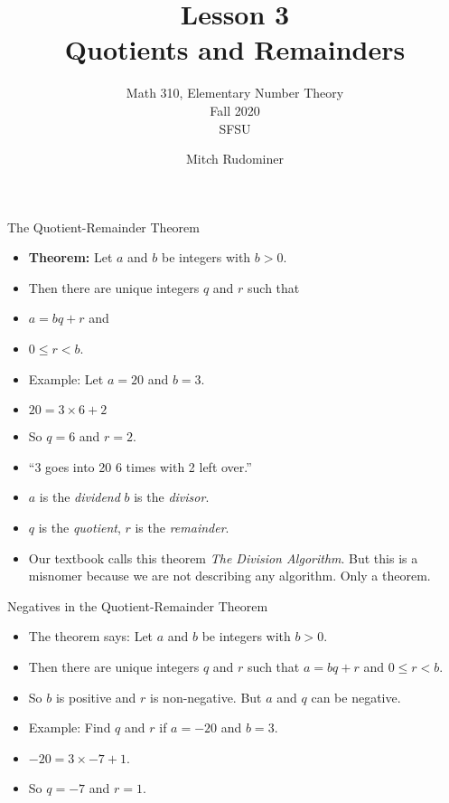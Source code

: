 \documentclass[handout]{beamer}
\title{Lesson 3 \\ Quotients and Remainders}
\subtitle{Math 310, Elementary Number Theory \\ Fall 2020 \\ SFSU}
\author{Mitch Rudominer}
\date{}
\begin{document}
\begin{frame}
  \titlepage
\end{frame}


\begin{frame}{The Quotient-Remainder Theorem}


\begin{itemize}
  \item \textbf{Theorem:} Let $a$ and $b$ be integers with $b>0$.
  \item Then there are unique integers $q$ and $r$ such that
  \item $a=bq+r$ and
  \item $0\leq r < b$.
  \item Example: Let $a=20$ and $b=3$.
  \item $20 = 3 \times 6 + 2$
  \item So $q=6$ and $r=2$.
  \item ``3 goes into 20 6 times with 2 left over.''
  \item $a$ is the \emph{dividend} $b$ is the \emph{divisor}.
  \item $q$ is the \emph{quotient}, $r$ is the \emph{remainder}.
  \item Our textbook calls this theorem \emph{The Division Algorithm}.
  But this is a misnomer because we are not describing any algorithm. Only
  a theorem.
\end{itemize}

\end{frame}

\begin{frame}{Negatives in the Quotient-Remainder Theorem}


\begin{itemize}
  \item The theorem says: Let $a$ and $b$ be integers with $b>0$.
  \item Then there are unique integers $q$ and $r$ such that
  $a=bq+r$ and $0\leq r < b$.
  \item So $b$ is positive and $r$ is non-negative. But $a$ and $q$ can be negative.
  \item Example: Find $q$ and $r$ if $a=-20$ and $b=3$.
  \item $-20 = 3 \times -7 + 1$.
  \item So $q=-7$ and $r=1$.
\end{itemize}

\end{frame}
\end{document}
